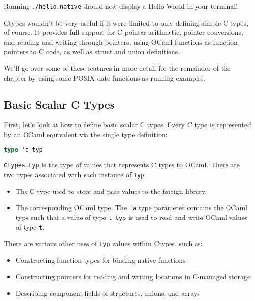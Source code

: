 Running \passthrough{\lstinline!./hello.native!} should now display a
Hello World in your terminal!

Ctypes wouldn't be very useful if it were limited to only defining
simple C types, of course. It provides full support for C pointer
arithmetic, pointer conversions, and reading and writing through
pointers, using OCaml functions as function pointers to C code, as well
as struct and union definitions.

We'll go over some of these features in more detail for the remainder of
the chapter by using some POSIX date functions as running examples.~

\hypertarget{basic-scalar-c-types}{%
\subsection{Basic Scalar C Types}\label{basic-scalar-c-types}}

First, let's look at how to define basic scalar C types. Every C type is
represented by an OCaml equivalent via the single type
definition:

\begin{lstlisting}[language=Caml]
type 'a typ
\end{lstlisting}

\passthrough{\lstinline!Ctypes.typ!} is the type of values that
represents C types to OCaml. There are two types associated with each
instance of \passthrough{\lstinline!typ!}:

\begin{itemize}
\item
  The C type used to store and pass values to the foreign library.
\item
  The corresponding OCaml type. The \passthrough{\lstinline!'a!} type
  parameter contains the OCaml type such that a value of type
  \passthrough{\lstinline!t typ!} is used to read and write OCaml values
  of type \passthrough{\lstinline!t!}.
\end{itemize}

There are various other uses of \passthrough{\lstinline!typ!} values
within Ctypes, such as:

\begin{itemize}
\item
  Constructing function types for binding native functions
\item
  Constructing pointers for reading and writing locations in C-managed
  storage
\item
  Describing component fields of structures, unions, and arrays
\end{itemize}


